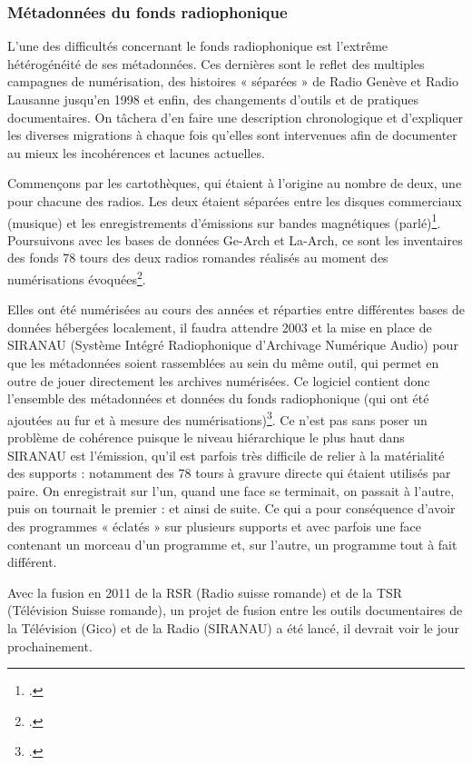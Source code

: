 \subsubsection{Métadonnées du fonds radiophonique}

L’une des difficultés concernant le fonds radiophonique est l’extrême hétérogénéité de ses métadonnées. Ces dernières sont le reflet des multiples campagnes de numérisation, des histoires « séparées » de Radio Genève et Radio Lausanne jusqu’en 1998 et enfin, des changements d’outils et de pratiques documentaires. On tâchera d’en faire une description chronologique et d’expliquer les diverses migrations à chaque fois qu’elles sont intervenues afin de documenter au mieux les incohérences et lacunes actuelles.

Commençons par les cartothèques, qui étaient à l’origine au nombre de deux, une pour chacune des radios. Les deux étaient séparées entre les disques commerciaux (musique) et les enregistrements d’émissions sur bandes magnétiques (parlé)\footcite[pp. 34-37]{prongue2009}. Poursuivons avec les bases de données Ge-Arch et La-Arch, ce sont les inventaires des fonds 78 tours des deux radios romandes réalisés au moment des numérisations évoquées\footcite[p. 33]{prongue2009}.

Elles ont été numérisées au cours des années et réparties entre différentes bases de données hébergées localement, il faudra attendre 2003 et la mise en place de SIRANAU (Système Intégré Radiophonique d’Archivage Numérique Audio) pour que les métadonnées soient rassemblées au sein du même outil, qui permet en outre de jouer directement les archives numérisées. Ce logiciel contient donc l’ensemble des métadonnées et données du fonds radiophonique (qui ont été ajoutées au fur et à mesure des numérisations)\footcite[p. 37]{prongue2009}. Ce n’est pas sans poser un problème de cohérence puisque le niveau hiérarchique le plus haut dans SIRANAU est l'émission, qu’il est parfois très difficile de relier à la matérialité des supports : notamment des 78 tours à gravure directe qui étaient utilisés par paire. On enregistrait sur l’un, quand une face se terminait, on passait à l’autre, puis on tournait le premier : et ainsi de suite. Ce qui a pour conséquence d’avoir des programmes « éclatés » sur plusieurs supports et avec parfois une face contenant un morceau d’un programme et, sur l’autre, un programme tout à fait différent.

Avec la fusion en 2011 de la RSR (Radio suisse romande) et de la TSR (Télévision Suisse romande), un projet de fusion entre les outils documentaires de la Télévision (Gico) et de la Radio (SIRANAU) a été lancé, il devrait voir le jour prochainement.

